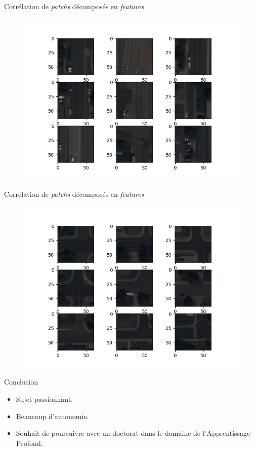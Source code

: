 \documentclass[11pt]{beamer}
\begin{document}
\begin{frame}{Corrélation de \emph{patchs} décomposés en \emph{features}}
	\begin{figure}[H]
		\centering
		\includegraphics[scale=0.6]{Images/CommerceCity_Correlation_1.png}
	\end{figure}
\end{frame}

\begin{frame}{Corrélation de \emph{patchs} décomposés en \emph{features}}
	\begin{figure}[H]
		\centering
		\includegraphics[scale=0.6]{Images/CommerceCity_Correlation_2.png}
	\end{figure}
\end{frame}

\begin{frame}{Conclusion}
	\begin{itemize}
		\item Sujet passionnant.
		\item Beaucoup d'autonomie.
		\item Souhait de poursuivre avec un doctorat dans le domaine de l'Apprentissage Profond.
	\end{itemize}
\end{frame}
\end{document}
